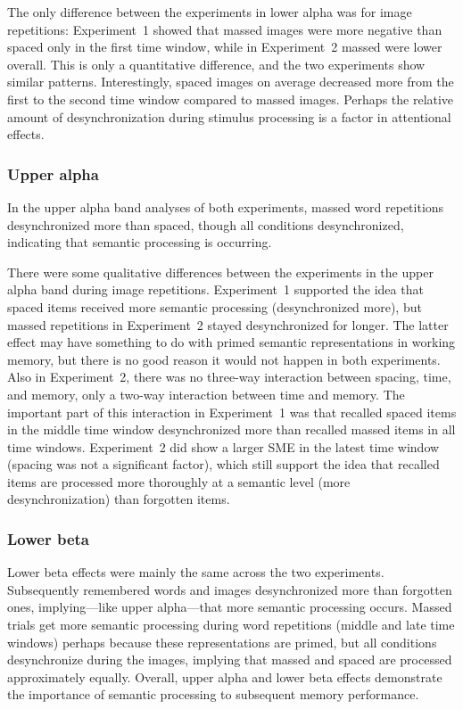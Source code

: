 The only difference between the experiments in lower alpha was for image repetitions: Experiment~1 showed that massed images were more negative than spaced only in the first time window, while in Experiment~2 massed were lower overall.  This is only a quantitative difference, and the two experiments show similar patterns.  Interestingly, spaced images on average decreased more from the first to the second time window compared to massed images.  Perhaps the relative amount of desynchronization during stimulus processing is a factor in attentional effects.

\subsubsection{Upper alpha}

In the upper alpha band analyses of both experiments, massed word repetitions desynchronized more than spaced, though all conditions desynchronized, indicating that semantic processing is occurring.

There were some qualitative differences between the experiments in the upper alpha band during image repetitions.  Experiment~1 supported the idea that spaced items received more semantic processing (desynchronized more), but massed repetitions in Experiment~2 stayed desynchronized for longer.  The latter effect may have something to do with primed semantic representations in working memory, but there is no good reason it would not happen in both experiments.  Also in Experiment~2, there was no three-way interaction between spacing, time, and memory, only a two-way interaction between time and memory.  The important part of this interaction in Experiment~1 was that recalled spaced items in the middle time window desynchronized more than recalled massed items in all time windows.  Experiment~2 did show a larger SME in the latest time window (spacing was not a significant factor), which still support the idea that recalled items are processed more thoroughly at a semantic level (more desynchronization) than forgotten items.



\subsubsection{Lower beta}

Lower beta effects were mainly the same across the two experiments.  Subsequently remembered words and images desynchronized more than forgotten ones, implying---like upper alpha---that more semantic processing occurs.
Massed trials get more semantic processing during word repetitions (middle and late time windows) perhaps because these representations are primed, but all conditions desynchronize during the images, implying that massed and spaced are processed approximately equally.  Overall, upper alpha and lower beta effects demonstrate the importance of semantic processing to subsequent memory performance.

